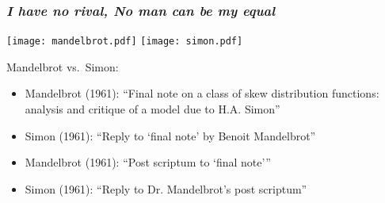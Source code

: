 \begin{frame}
  \frametitle{\small\textit{I have no rival, No man can be my equal}}

  \smallskip

  \texttt{[image: mandelbrot.pdf]}
  \quad
  \texttt{[image: simon.pdf]}

  \begin{block}{Mandelbrot vs.\ Simon:}
    \begin{itemize}
    \item<1-> Mandelbrot (1961): ``Final note on a class of skew distribution functions: analysis and critique of a model due to H.A. Simon''\cite{mandelbrot1961b}
    \item<2-> Simon (1961): ``Reply to `final note' by Benoit Mandelbrot''\cite{simon1961a}
    \item<3-> Mandelbrot (1961): ``Post scriptum to `final note'''\cite{mandelbrot1961b}
    \item<4-> Simon (1961): ``Reply to Dr. Mandelbrot's post scriptum''\cite{simon1961b}
  \end{itemize}
  \end{block}
\end{frame}

